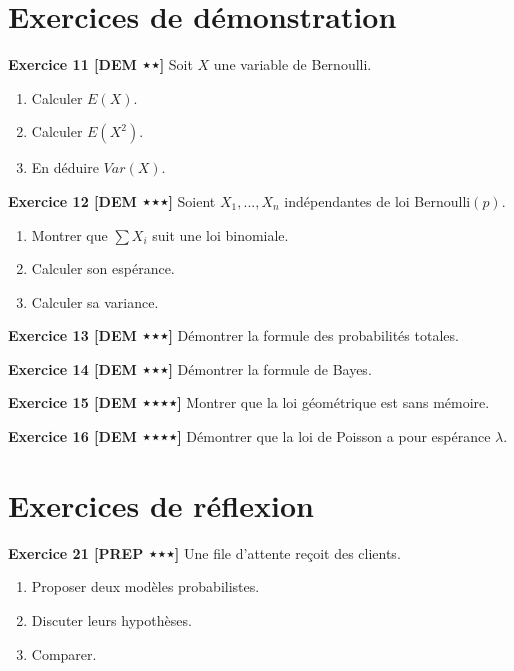 \documentclass[11pt,a4paper]{article}
\begin{document}
\section{Exercices de démonstration}

\textbf{Exercice 11 [DEM ⋆⋆]}  
Soit $X$ une variable de Bernoulli.  
\begin{enumerate}
\item Calculer $E(X)$.
\item Calculer $E(X^2)$.
\item En déduire $Var(X)$.
\end{enumerate}

\textbf{Exercice 12 [DEM ⋆⋆⋆]}  
Soient $X_1,...,X_n$ indépendantes de loi Bernoulli$(p)$.  
\begin{enumerate}
\item Montrer que $\sum X_i$ suit une loi binomiale.
\item Calculer son espérance.
\item Calculer sa variance.
\end{enumerate}

\textbf{Exercice 13 [DEM ⋆⋆⋆]}  
Démontrer la formule des probabilités totales.

\textbf{Exercice 14 [DEM ⋆⋆⋆]}  
Démontrer la formule de Bayes.

\textbf{Exercice 15 [DEM ⋆⋆⋆⋆]}  
Montrer que la loi géométrique est sans mémoire.

\textbf{Exercice 16 [DEM ⋆⋆⋆⋆]}  
Démontrer que la loi de Poisson a pour espérance $\lambda$.

\section{Exercices de réflexion}

\textbf{Exercice 21 [PREP ⋆⋆⋆]}  
Une file d’attente reçoit des clients.  
\begin{enumerate}
\item Proposer deux modèles probabilistes.
\item Discuter leurs hypothèses.
\item Comparer.
\end{enumerate}
\end{document}
